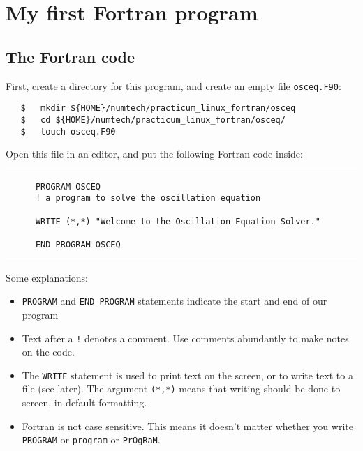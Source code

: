 \documentclass[a4paper]{article}
\begin{document}
\section{My first Fortran program}
%
\subsection{The Fortran code}
%
\par
First, create a directory for this program, and create an empty file \texttt{osceq.F90}:
%
\begin{verbatim}
   $   mkdir ${HOME}/numtech/practicum_linux_fortran/osceq
   $   cd ${HOME}/numtech/practicum_linux_fortran/osceq/
   $   touch osceq.F90
\end{verbatim}
%
\par
Open this file in an editor, and put the following Fortran code inside:
%
{\vspace{10pt}\hrule\small\vspace*{-2pt}\begin{verbatim}
	  PROGRAM OSCEQ
	  ! a program to solve the oscillation equation
	  
	  WRITE (*,*) "Welcome to the Oscillation Equation Solver."
	  
	  END PROGRAM OSCEQ
\end{verbatim}\hrule\vspace{5pt}}
%
Some explanations:
%
\begin{itemize}
	\item \verb+PROGRAM+ and \verb+END PROGRAM+ statements indicate the start and end of our program
	\item Text after a \verb+!+ denotes a comment. Use comments abundantly to make notes on the code.
	\item The \verb+WRITE+ statement is used to print text on the screen, or to write text to a file (see later). The argument \verb+(*,*)+ means that writing should be done to screen, in default formatting.
	\item Fortran is not case sensitive. This means it doesn't matter whether you write \verb+PROGRAM+ or \verb+program+ or \verb+PrOgRaM+.
\end{itemize}
%
\end{document}
